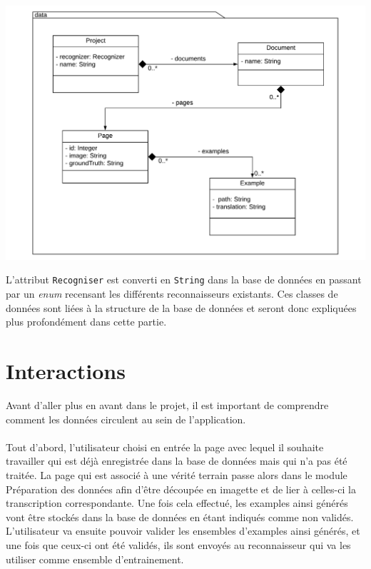 \begin{mdframed}[frametitle={Figure 9 : Structure du package de données}, innerbottommargin=10]
\begin{center}
\includegraphics[scale=0.4]{assets/UML_data.pdf}
\end{center}
\end{mdframed}

L'attribut \texttt{Recogniser} est converti en \texttt{String} dans la base de données en passant par un \textit{enum} recensant les différents reconnaisseurs existants. Ces classes de données sont liées à la structure de la base de données et seront donc expliquées plus profondément dans cette partie.

\section{Interactions}

Avant d'aller plus en avant dans le projet, il est important de comprendre comment les données circulent au sein de l'application. 

\paragraph{}
Tout d'abord, l'utilisateur choisi en entrée la page avec lequel il souhaite travailler qui est déjà enregistrée dans la base de données mais qui n'a pas été traitée. La page qui est associé à une vérité terrain passe alors dans le module Préparation des données afin d'être découpée en imagette et de lier à celles-ci la transcription correspondante. Une fois cela effectué, les examples ainsi générés vont être stockés dans la base de données en étant indiqués comme non validés. L'utilisateur va ensuite pouvoir valider les ensembles d'examples ainsi générés, et une fois que ceux-ci ont été validés, ils sont envoyés au reconnaisseur qui va les utiliser comme ensemble d'entrainement.

